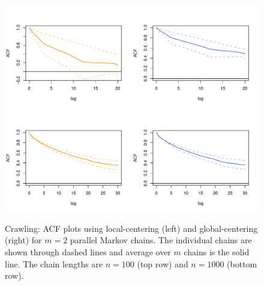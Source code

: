 \documentclass[11pt]{article}
\theoremstyle{remark}
\begin{document}
\begin{figure}[htbp]
    \centering
      \includegraphics[width = .6\textwidth]{plots/magnolia-acf_n100.pdf}\\ \vspace{-.5cm}
      \includegraphics[width = .6\textwidth]{plots/magnolia-acf_n1000.pdf}

    \caption{Crawling:  ACF plots using local-centering (left) and global-centering (right) for $m=2$ parallel Markov chains. The individual chains are shown through dashed lines and average over $m$ chains is the solid line. The chain lengths are $n = 100$ (top row) and $n = 1000$ (bottom row).}
    \label{fig:magnolia-acf}
\end{figure}






\end{document}
